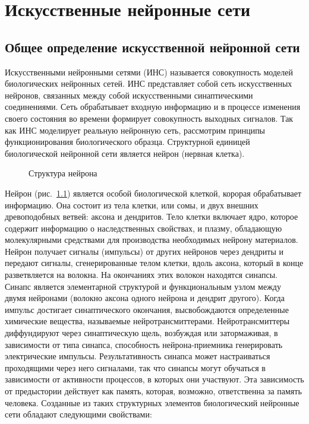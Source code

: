 \chapter{Искусственные нейронные сети}
\section{Общее определение искусственной нейронной сети}

Искусственными нейронными сетями (ИНС) называется совокупность моделей биологических нейронных сетей.
ИНС представляет собой сеть искусственных нейронов, связанных между собой искусственными синаптическими соединениями.
Сеть обрабатывает входную информацию и в процессе изменения своего состояния во времени формирует совокупность выходных сигналов.\cite{COURSE}
Так как ИНС моделирует реальную нейронную сеть, рассмотрим принципы функционирования биологического образца.
Структурной единицей биологической нейронной сети является нейрон (нервная клетка).
\begin{figure}[h]
\caption{Структура нейрона}
\label{ris:neuron}
\end{figure}
Нейрон (рис.~\ref{ris:neuron}) является особой биологической клеткой, корорая обрабатывает информацию.
Она состоит из тела клетки, или сомы, и двух внешних древоподобных ветвей: аксона и дендритов.
Тело клетки включает ядро, которое содержит информацию о наследственных свойствах, и плазму, обладающую молекулярными средствами для производства необходимых нейрону материалов.
Нейрон получает сигналы (импульсы) от других нейронов через дендриты и передают сигналы, сгенерированные телом клетки, вдоль аксона, который в конце разветвляется на волокна.
На окончаниях этих волокон находятся синапсы. 
Синапс является элементарной структурой и функциональным узлом между двумя нейронами (волокно аксона одного нейрона и дендрит другого).
Когда импульс достигает синаптического окончания, высвобождаются определенные химические вещества, называемые нейротрансмиттерами.
Нейротрансмиттеры диффундируют через синаптическую щель, возбуждая или затормаживая, в зависимости от типа синапса, способность нейрона-приемника генерировать электрические импульсы.
Результативность синапса может настраиваться проходящими через него сигналами, так что синапсы могут обучаться в зависимости от активности процессов, в которых они участвуют.
Эта зависимость от предыстории действует как память, которая, возможно, ответственна за память человека.
\cite{nn_int_jain}
Созданные из таких структурных элементов биологический нейронные сети обладают следующими свойствами:
